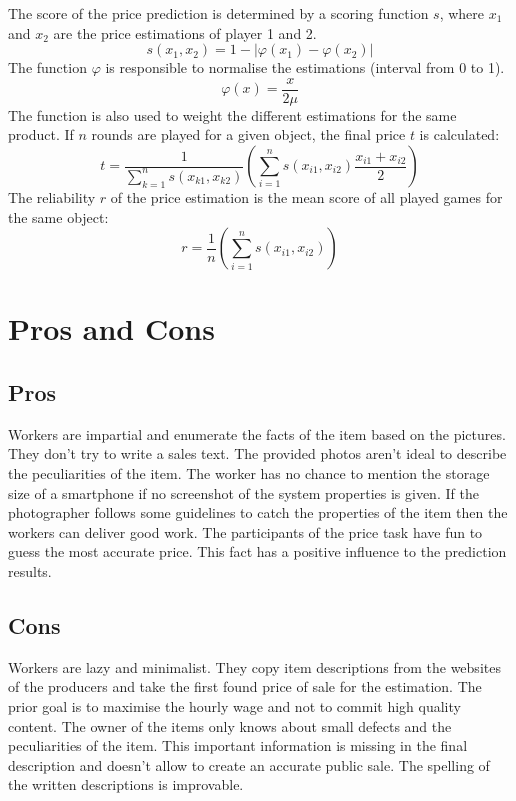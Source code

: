 The score of the price prediction is determined by a scoring function \( s \), where \( x_1 \) and \( x_2 \) are the price estimations of player 1 and 2.
\begin{equation}
s(x_1,x_2) = 1 - |\varphi(x_1) - \varphi(x_2)|
\end{equation}
The function \( \varphi \) is responsible to normalise the estimations (interval from 0 to 1).
\begin{equation}
\varphi(x) = \frac{x}{2\mu}
\end{equation}
The function is also used to weight the different estimations for the same product. If \( n \) rounds are played for a given object, the final price \( t \) is calculated:
\begin{equation}
t = \frac{1}{\sum_{k=1}^{n} s(x_{k1},x_{k2})}\left(\sum_{i=1}^{n} s(x_{i1},x_{i2})\frac{x_{i1}+x_{i2}}{2}\right)
\end{equation}
The reliability \( r \) of the price estimation is the mean score of all played games for the same object:
\begin{equation}
r = \frac{1}{n}\left(\sum_{i=1}^{n} s(x_{i1},x_{i2})\right)
\end{equation}

\section{Pros and Cons}
\subsection{Pros}
Workers are impartial and enumerate the facts of the item based on the pictures. They don't try to write a sales text. The provided photos aren't ideal to describe the peculiarities of the item. The worker has no chance to mention the storage size of a smartphone if no screenshot of the system properties is given. If the photographer follows some guidelines to catch the properties of the item then the workers can deliver good work. The participants of the price task have fun to guess the most accurate price. This fact has a positive influence to the prediction results. 
\subsection{Cons}
Workers are lazy and minimalist. They copy item descriptions from the websites of the producers and take the first found price of sale for the estimation. The prior goal is to maximise the hourly wage and not to commit high quality content. The owner of the items only knows about small defects and the peculiarities of the item. This important information is missing in the final description and doesn't allow to create an accurate public sale. The spelling of the written descriptions is improvable.
